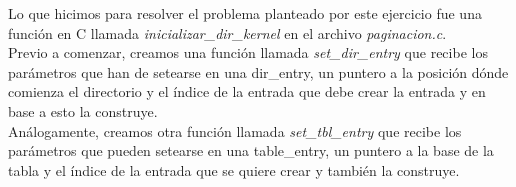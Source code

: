 Lo que hicimos para resolver el problema planteado por este ejercicio fue una función en C llamada \textit{inicializar\_dir\_kernel} en el archivo \textit{paginacion.c}.\\

Previo a comenzar, creamos una función llamada \textit{set\_dir\_entry} que recibe los parámetros que han de setearse en una dir\_entry, un puntero a la posición dónde comienza el directorio y el índice de la entrada que debe crear la entrada y en base a esto la construye.\\
Análogamente, creamos otra función llamada \textit{set\_tbl\_entry} que recibe los parámetros que pueden setearse en una table\_entry, un puntero a la base de la tabla y el índice de la entrada que se quiere crear y también la construye.\\

